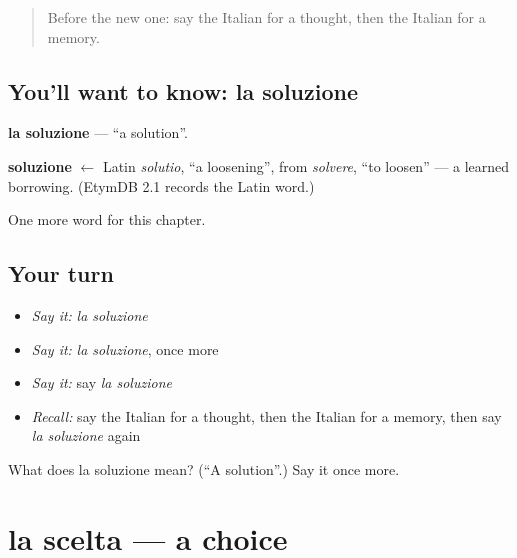 \label{lesson:IT-C196-soluzione}



\begin{quote}
Before the new one: say the Italian for a thought, then the Italian for a memory.
\end{quote}

\subsection*{You'll want to know: la soluzione}
\textbf{la soluzione} — \textquotedblleft{}a solution\textquotedblright{}.

\begin{cousinweb}
\textbf{soluzione} $\leftarrow$ Latin \emph{solutio}, \textquotedblleft{}a loosening\textquotedblright{}, from \emph{solvere}, \textquotedblleft{}to loosen\textquotedblright{} — a learned borrowing. (EtymDB 2.1 records the Latin word.)
\end{cousinweb}

\begin{grammarlens}[title={What you've built}]
One more word for this chapter.
\end{grammarlens}

\subsection*{Your turn}
\begin{itemize}
\raggedright
  \item \emph{Say it:} \emph{la soluzione}
  \item \emph{Say it:} \emph{la soluzione}, once more
  \item \emph{Say it:} say \emph{la soluzione}
  \item \emph{Recall:} say the Italian for a thought, then the Italian for a memory, then say \emph{la soluzione} again
\end{itemize}

\begin{tcolorbox}[breakable,colback=teal!4,colframe=teal!35!black,title={Before you move on}]
What does la soluzione mean? (\textquotedblleft{}A solution\textquotedblright{}.) Say it once more.
\end{tcolorbox}
\section[la scelta]{la scelta — a choice}

\label{lesson:IT-C196-scelta}



